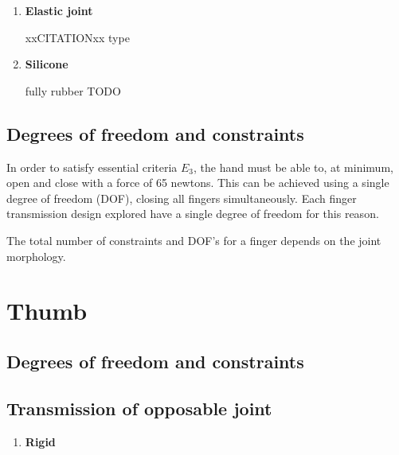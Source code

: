 \documentclass[12pt,3p]{report}
\begin{document}
\begin{multicols}{2}
\begin{enumerate}
{		As pictured above TODO
		}
		\item \textbf{Elastic joint} {
		
		xxCITATIONxx type
		}
		\item \textbf{Silicone} {
		
		fully rubber TODO
		}
		\end{enumerate}

	


\subsection{Degrees of freedom and constraints}
		
		In order to satisfy essential criteria $E_3$, the hand must be able to, at minimum, open and close with a force of 65 newtons. This can be achieved using a single degree of freedom (DOF), closing all fingers simultaneously. Each finger transmission design explored have a single degree of freedom for this reason. 
		
		The total number of constraints and DOF's for a finger depends on the joint morphology.



	\section{Thumb}
	
		\subsection{Degrees of freedom and constraints}

		
		\subsection{Transmission of opposable joint}
			\begin{enumerate}
			\item \textbf{Rigid} {
			
}
\end{enumerate}
\end{multicols}
\end{document}
